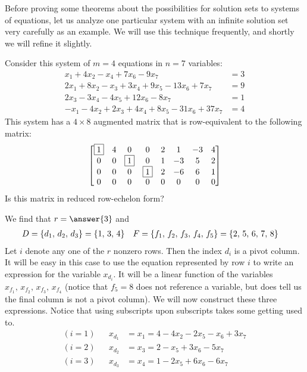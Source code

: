 \documentclass{ximera}
\begin{document}
Before proving some theorems about the possibilities for solution sets
to systems of equations, let us analyze one particular system with an
infinite solution set very carefully as an example.  We will use this
technique frequently, and shortly we will refine it slightly.


\begin{example}

Consider this system of $m=4$ equations in $n=7$ variables:
\begin{align*}
x_1 +4x_2  - x_4  + 7x_6 - 9x_7 &= 3\\
2x_1 + 8x_2 - x_3 + 3x_4 + 9x_5 - 13x_6 + 7x_7 &= 9\\
 2x_3 -3x_4 -4x_5 +12x_6 -8x_7 &= 1\\
-x_1  - 4x_2 + 2x_3 +4x_4 + 8x_5 - 31x_6 + 37x_7 &= 4
\end{align*}
This system has a $4\times 8$ augmented matrix that is row-equivalent to the following matrix:
\[
\begin{bmatrix}
\fbox{1} & 4 & 0 & 0 & 2 & 1 & -3 & 4 \\
0 & 0 & \fbox{1}  &  0 & 1 &  -3 & 5 & 2 \\
0 & 0 &  0 & \fbox{1} & 2 &  -6 & 6 & 1 \\
0 & 0 &  0 & 0 & 0 & 0 & 0 & 0
\end{bmatrix}
\]
Is this matrix in reduced row-echelon form?
\begin{multipleChoice}
\end{multipleChoice}
We find that $r=\answer{3}$ and
\begin{align*}
  D&=\left\{d_1,\,d_2,\,d_3\right\}=\left\{1,\,3,\,4\right\}
  &
    F&=\left\{f_1,\,f_2,\,f_3,\,f_4,\,f_5\right\}=\left\{2,\,5,\,6,\,7,\,8\right\}
\end{align*}
Let $i$ denote any one of the $r$ nonzero rows.  Then the index $d_i$ is a pivot column.  It will be easy in this case to use the equation represented by row $i$ to write an expression for the variable $x_{d_i}$.  It will be a linear function of the variables $x_{f_1},\,x_{f_2},\,x_{f_3},\,x_{f_4}$ (notice that $f_5=8$ does not reference a variable, but does tell us the final column is not a pivot column).  We will now construct these three expressions.  Notice that using subscripts upon subscripts takes some getting used to.
\begin{align*}
(i=1)& & x_{d_1}&=x_1=4-4x_2-2x_5-x_6+3x_7\\
(i=2)& & x_{d_2}&=x_3=2-x_5+3x_6-5x_7\\
(i=3)& & x_{d_3}&=x_4=1-2x_5+6x_6-6x_7
\end{align*}


\end{example}
\end{document}
